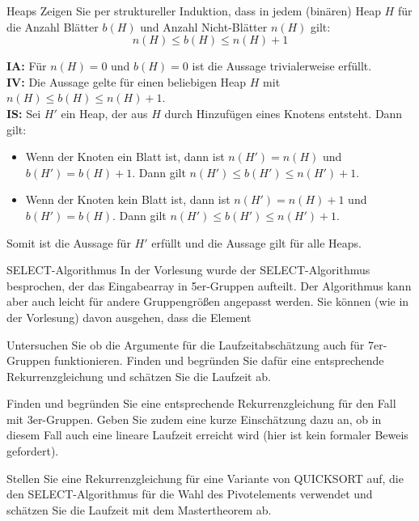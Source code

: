 \documentclass{article}
\begin{document}
\begin{exercise}{Heaps}
  Zeigen Sie per struktureller Induktion, dass in jedem (binären) Heap $H$ für die Anzahl Blätter $b(H)$ und Anzahl Nicht-Blätter $n(H)$ gilt:
  \begin{equation*}
    n(H) \leq b(H) \leq n(H)+1
  \end{equation*}

  \begin{solution}
    \textbf{IA:} Für $n(H) = 0$ und $b(H) = 0$ ist die Aussage trivialerweise erfüllt. \\
    \textbf{IV:} Die Aussage gelte für einen beliebigen Heap $H$ mit $n(H) \leq b(H) \leq n(H)+1$. \\
    \textbf{IS:} Sei $H'$ ein Heap, der aus $H$ durch Hinzufügen eines Knotens entsteht. Dann gilt:
    \begin{itemize}
      \item Wenn der Knoten ein Blatt ist, dann ist $n(H') = n(H)$ und $b(H') = b(H)+1$. Dann gilt $n(H') \leq b(H') \leq n(H')+1$.
      \item Wenn der Knoten kein Blatt ist, dann ist $n(H') = n(H)+1$ und $b(H') = b(H)$. Dann gilt $n(H') \leq b(H') \leq n(H')+1$.
    \end{itemize}
    Somit ist die Aussage für $H'$ erfüllt und die Aussage gilt für alle Heaps.
  \end{solution}
\end{exercise}

\begin{eexercises}{SELECT-Algorithmus}{
    In der Vorlesung wurde der SELECT-Algorithmus besprochen, der das Eingabearray in 5er-Gruppen aufteilt. Der Algorithmus kann aber auch leicht für andere Gruppengrößen angepasst werden. Sie können (wie in der Vorlesung) davon ausgehen, dass die Element
  }
  \item Untersuchen Sie ob die Argumente für die Laufzeitabschätzung auch für 7er-Gruppen funktionieren. Finden und begründen Sie dafür eine entsprechende Rekurrenzgleichung und schätzen Sie die Laufzeit ab.
  \item Finden und begründen Sie eine entsprechende Rekurrenzgleichung für den Fall mit 3er-Gruppen. Geben Sie zudem eine kurze Einschätzung dazu an, ob in diesem Fall auch eine lineare Laufzeit erreicht wird (hier ist kein formaler Beweis gefordert).
  \item Stellen Sie eine Rekurrenzgleichung für eine Variante von QUICKSORT auf, die den SELECT-Algorithmus für die Wahl des Pivotelements verwendet und schätzen Sie die Laufzeit mit dem Mastertheorem ab.
\end{eexercises}
\end{document}
